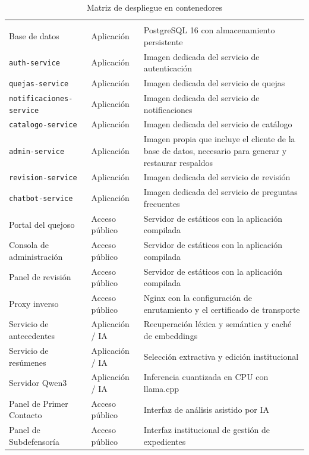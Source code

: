 \begin{longtable}{|p{3.4cm}|p{3.0cm}|p{7.6cm}|}
	\caption{Matriz de despliegue en contenedores}
	\label{tab:contenedores} \\
	\hline
	\rowcolor{headerblue}
	\headercell{Contenedor} & \headercell{Servidor} & \headercell{Contenido} \\
	\hline
	\endfirsthead

	\hline
	\rowcolor{headerblue}
	\headercell{Contenedor} & \headercell{Servidor} & \headercell{Contenido} \\
	\hline
	\endhead

	Base de datos & Aplicación & PostgreSQL 16 con almacenamiento persistente \\ \hline
	\texttt{auth-service} & Aplicación & Imagen dedicada del servicio de autenticación \\ \hline
	\texttt{quejas-service} & Aplicación & Imagen dedicada del servicio de quejas \\ \hline
	\texttt{notificaciones-\allowbreak service} & Aplicación & Imagen dedicada del servicio de
	notificaciones \\ \hline
	\texttt{catalogo-\allowbreak service} & Aplicación & Imagen dedicada del servicio de catálogo \\ \hline
	\texttt{admin-service} & Aplicación & Imagen propia que incluye el cliente de la base de
	datos, necesario para generar y restaurar respaldos \\ \hline
	\texttt{revision-\allowbreak service} & Aplicación & Imagen dedicada del servicio de revisión \\ \hline
	\texttt{chatbot-\allowbreak service} & Aplicación & Imagen dedicada del servicio de preguntas frecuentes
	\\ \hline
	Portal del quejoso & Acceso público & Servidor de estáticos con la aplicación compilada
	\\ \hline
	Consola de administración & Acceso público & Servidor de estáticos con la aplicación compilada
	\\ \hline
	Panel de revisión & Acceso público & Servidor de estáticos con la aplicación compilada
	\\ \hline
	Proxy inverso & Acceso público & Nginx con la configuración de enrutamiento y el certificado
	de transporte \\ \hline
	Servicio de antecedentes & Aplicación / IA & Recuperación léxica y semántica y caché de embeddings \\ \hline
	Servicio de resúmenes & Aplicación / IA & Selección extractiva y edición institucional \\ \hline
	Servidor Qwen3 & Aplicación / IA & Inferencia cuantizada en CPU con llama.cpp \\ \hline
	Panel de Primer Contacto & Acceso público & Interfaz de análisis asistido por IA \\ \hline
	Panel de Subdefensoría & Acceso público & Interfaz institucional de gestión de expedientes \\ \hline
\end{longtable}

